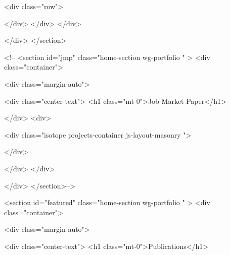     <div class="row">





    </div>
  </div>
</div>

    </div>
  </section>































<!--  <section id="jmp" class="home-section wg-portfolio   "  >
    <div class="container">



      <div class="margin-auto">

        <div class="center-text">
          <h1 class="mt-0">Job Market Paper</h1>

        </div>
        <div>



      <div class="isotope projects-container js-layout-masonry ">

      </div>

      </div>
      </div>

      </div>
    </section>-->



      <section id="featured" class="home-section wg-portfolio   "  >
        <div class="container">



          <div class="margin-auto">

            <div class="center-text">
    <h1 class="mt-0">Publications</h1>

